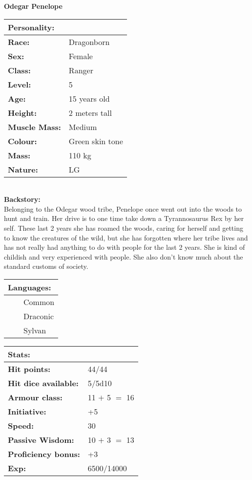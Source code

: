 \documentclass[11pt]{article}
\newcommand{\tabitem}{~~\llap{--}~~}
\begin{document}
	\begin{center}
\Huge \textbf{Odegar Penelope}
	\end{center}
	\begin{multicols}{2}
\noindent \begin{tabularx}{\linewidth}{@{}l l}
\Large \textbf{Personality:} 	& 						\\
\hline
\textbf{Race:} 					& Dragonborn 			\\
\textbf{Sex:} 					& Female 				\\
\textbf{Class:}					& Ranger				\\
\textbf{Level:} 				& 5						\\
\textbf{Age:} 					& 15 years old			\\
\textbf{Height:} 				& 2 meters tall 		\\
\textbf{Muscle Mass:} 			& Medium 				\\
\textbf{Colour:} 				& Green skin tone	 	\\
\textbf{Mass:} 					& 110 kg		 		\\
\textbf{Nature:} 				& LG
		\end{tabularx} \\
\textbf{Backstory:} \\
Belonging to the Odegar wood tribe, Penelope once went out into the woods to hunt and train. Her drive is to one time take down a Tyrannosaurus Rex by her self. These last 2 years she has roamed the woods, caring for herself and getting to know the creatures of the wild, but she has forgotten where her tribe lives and has not really had anything to do with people for the last 2 years. She is kind of childish and very experienced with people. She also don't know much about the standard customs of society.

\noindent \begin{tabularx}{\linewidth}{@{}l}
{\Large \textbf{Languages:}} \\
\hline
\tabitem Common \\
\tabitem Draconic \\
\tabitem Sylvan
		\end{tabularx}

\vspace{4mm}

\noindent \begin{tabularx}{\linewidth}{@{}l l}
\Large \textbf{Stats:}		 	& 									\\
\hline
\textbf{Hit points:} 			& 44/44					 			\\
\textbf{Hit dice available:}	& 5/5d10							\\
\textbf{Armour class:} 			& 11 $+$ 5 $=$ 16				 	\\
\textbf{Initiative:} 			& +5								\\
\textbf{Speed:} 				& 30		 						\\
\textbf{Passive Wisdom:} 		& 10 $+$ 3 $=$ 13 					\\
\textbf{Proficiency bonus:}		& +3								\\
\textbf{Exp:} 					& 6500/14000
		\end{tabularx}


\end{multicols}
\end{document}
